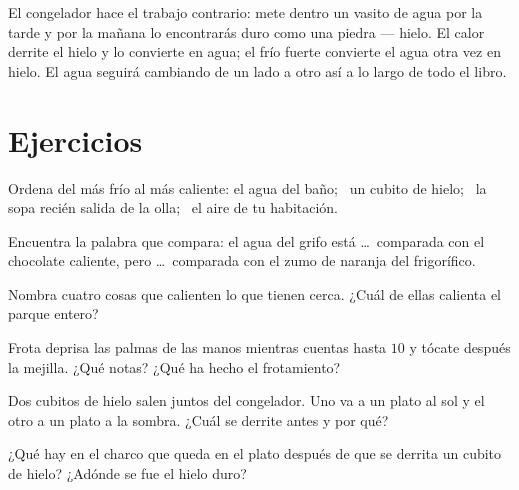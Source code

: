 \begin{example}\label{ex:g1:hot-and-cold:freezer}
El congelador hace el trabajo contrario: mete dentro un vasito de agua
por la tarde y por la mañana lo encontrarás duro como una piedra ---
hielo. El calor derrite el hielo y lo convierte en agua; el frío
fuerte convierte el agua otra vez en hielo. El agua seguirá cambiando
de un lado a otro así a lo largo de todo el libro.
\end{example}

\section{Ejercicios}

\begin{exercise}[$\star$]\label{exo:g1:hot-and-cold:1}
Ordena del más frío al más caliente: el agua del baño; \ un cubito de
hielo; \ la sopa recién salida de la olla; \ el aire de tu
habitación.
\end{exercise}

\begin{exercise}[$\star$]\label{exo:g1:hot-and-cold:2}
Encuentra la palabra que compara: el agua del grifo está \dots\
comparada con el chocolate caliente, pero \dots\ comparada con el zumo
de naranja del frigorífico.
\end{exercise}

\begin{exercise}[$\star$]\label{exo:g1:hot-and-cold:3}
Nombra cuatro cosas que calienten lo que tienen cerca. ¿Cuál de ellas
calienta el parque entero?
\end{exercise}

\begin{exercise}[$\star$]\label{exo:g1:hot-and-cold:4}
Frota deprisa las palmas de las manos mientras cuentas hasta $10$ y
tócate después la mejilla. ¿Qué notas? ¿Qué ha hecho el frotamiento?
\end{exercise}

\begin{exercise}[$\star$]\label{exo:g1:hot-and-cold:5}
Dos cubitos de hielo salen juntos del congelador. Uno va a un plato al
sol y el otro a un plato a la sombra. ¿Cuál se derrite antes y por
qué?
\end{exercise}

\begin{exercise}[$\star$]\label{exo:g1:hot-and-cold:6}
¿Qué hay en el charco que queda en el plato después de que se derrita
un cubito de hielo? ¿Adónde se fue el hielo duro?
\end{exercise}

